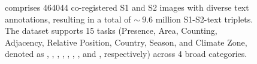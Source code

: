 \begin{figure}[h!tb]
    \caption{\bentxt{} comprises \num{464 044} co-registered \ac{S1} and \ac{S2} images with diverse text annotations, resulting in a total of $\sim~\num{9.6}$ million \ac{S1}-\ac{S2}-text triplets. The dataset supports 15 tasks (Presence, Area, Counting, Adjacency, Relative Position, Country, Season, and Climate Zone, denoted as \presenceABBR, \areaABBR, \countABBR, \adjacencyABBR, \relativepositionABBR, \countryABBR, \seasonABBR, and \climateABBR, respectively) across 4 broad categories.}
    \label{fig:dataset_overview}
\end{figure}